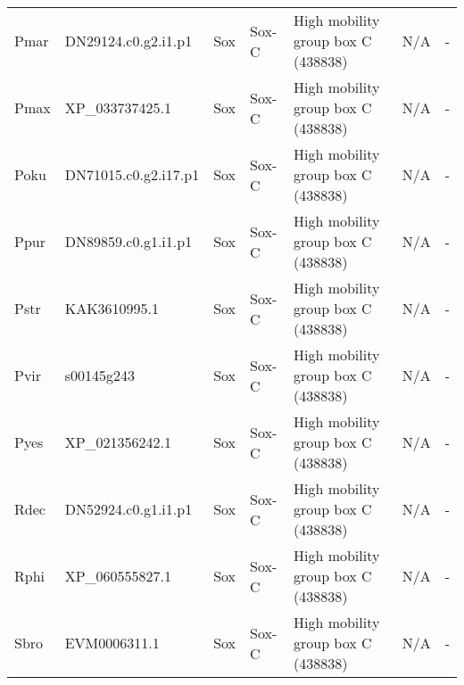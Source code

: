 \documentclass[../main.tex]{subfiles}
\begin{document}
\begin{landscape}
\begin{longtable}{lllllll}
		Pmar           & DN29124.c0.g2.i1.p1   & Sox            & Sox-C               & High mobility group box C (438838)          & N/A                                                                    & -                    \\
		Pmax           & XP\_033737425.1       & Sox            & Sox-C               & High mobility group box C (438838)          & N/A                                                                    & -                    \\
		Poku           & DN71015.c0.g2.i17.p1  & Sox            & Sox-C               & High mobility group box C (438838)          & N/A                                                                    & -                    \\
		Ppur           & DN89859.c0.g1.i1.p1   & Sox            & Sox-C               & High mobility group box C (438838)          & N/A                                                                    & -                    \\
		Pstr           & KAK3610995.1          & Sox            & Sox-C               & High mobility group box C (438838)          & N/A                                                                    & -                    \\
		Pvir           & s00145g243            & Sox            & Sox-C               & High mobility group box C (438838)          & N/A                                                                    & -                    \\
		Pyes           & XP\_021356242.1       & Sox            & Sox-C               & High mobility group box C (438838)          & N/A                                                                    & -                    \\
		Rdec           & DN52924.c0.g1.i1.p1   & Sox            & Sox-C               & High mobility group box C (438838)          & N/A                                                                    & -                    \\
		Rphi           & XP\_060555827.1       & Sox            & Sox-C               & High mobility group box C (438838)          & N/A                                                                    & -                    \\
		Sbro           & EVM0006311.1          & Sox            & Sox-C               & High mobility group box C (438838)          & N/A                                                                    & -                    \\

\end{longtable}
\end{landscape}
\end{document}
